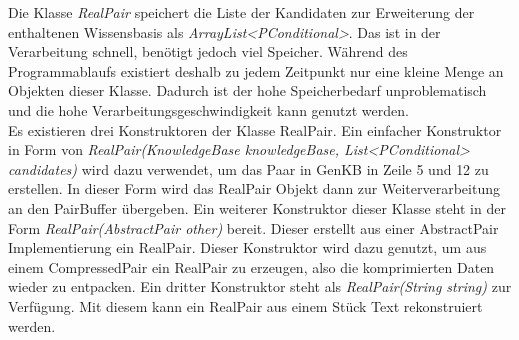 \documentclass[12pt,a4paper]{article}
\begin{document}
Die Klasse \textit{RealPair} speichert die Liste der Kandidaten zur Erweiterung der enthaltenen Wissensbasis als \textit{ArrayList<PConditional>}. Das ist in der Verarbeitung schnell, benötigt jedoch viel Speicher. Während des Programmablaufs existiert deshalb zu jedem Zeitpunkt nur eine kleine Menge an Objekten dieser Klasse. Dadurch ist der hohe Speicherbedarf unproblematisch und die hohe Verarbeitungsgeschwindigkeit kann genutzt werden. \\
Es existieren drei Konstruktoren der Klasse RealPair. Ein einfacher Konstruktor in Form von \textit{RealPair(KnowledgeBase knowledgeBase, List<PConditional> candidates)} wird dazu verwendet, um das Paar in GenKB in Zeile 5 und 12 zu erstellen. In dieser Form wird das RealPair Objekt dann zur Weiterverarbeitung an den PairBuffer übergeben. Ein weiterer Konstruktor dieser Klasse steht in der Form \textit{RealPair(AbstractPair other)} bereit. Dieser erstellt aus einer AbstractPair Implementierung ein RealPair. Dieser Konstruktor wird dazu genutzt, um aus einem CompressedPair ein RealPair zu erzeugen, also die komprimierten Daten wieder zu entpacken. Ein dritter Konstruktor steht als \textit{RealPair(String string)} zur Verfügung. Mit diesem kann ein RealPair aus einem Stück Text rekonstruiert werden. 
\end{document}
